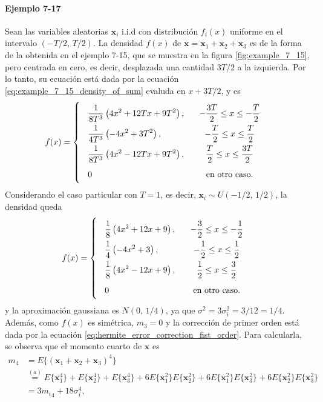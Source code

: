 \documentclass[a4paper]{report}
\newcommand{\x}{\mathbf{x}}
\begin{document}
\paragraph{Ejemplo 7-17} Sean las variables aleatorias \(\x_i\) i.i.d con distribución \(f_i(x)\) uniforme en el intervalo \((-T/2,\,T/2)\). La densidad \(f(x)\) de \(\x=\x_1+\x_2+\x_3\) es de la forma de la obtenida en el ejemplo 7-15, que se muestra en la figura \ref{fig:example_7_15}, pero centrada en cero, es decir, desplazada una cantidad \(3T/2\) a la izquierda. Por lo tanto, su ecuación está dada por la ecuación \ref{eq:example_7_15_density_of_sum} evaluda en \(x+3T/2\), y es
\[
 f(x)=
\def\arraystretch{2}\arraycolsep=9pt
 \left\{\begin{array}{lc}
   \displaystyle\frac{1}{8T^3}\left(4x^2+12Tx+9T^2\right), & -\dfrac{3T}{2}\leq x\leq-\dfrac{T}{2}\\
   \displaystyle\frac{1}{4T^3}\left(-4x^2+3T^2\right), & -\dfrac{T}{2}\leq x\leq\dfrac{T}{2}\\ 
   \displaystyle\frac{1}{8T^3}\left(4x^2-12Tx+9T^2\right), & \dfrac{T}{2}\leq x\leq\dfrac{3T}{2}\\ 
   0 & \textrm{en otro caso.}
 \end{array} \right.
\]
Considerando el caso particular con \(T=1\), es decir, \(\x_i\sim U(-1/2,\,1/2)\), la densidad queda
\[
 f(x)=
\def\arraystretch{2}\arraycolsep=9pt
 \left\{\begin{array}{lc}
   \displaystyle\frac{1}{8}\left(4x^2+12x+9\right), & -\dfrac{3}{2}\leq x\leq-\dfrac{1}{2}\\
   \displaystyle\frac{1}{4}\left(-4x^2+3\right), & -\dfrac{1}{2}\leq x\leq\dfrac{1}{2}\\ 
   \displaystyle\frac{1}{8}\left(4x^2-12x+9\right), & \dfrac{1}{2}\leq x\leq\dfrac{3}{2}\\ 
   0 & \textrm{en otro caso.}
 \end{array} \right.
\]
y la aproximación gaussiana es \(N(0,\,1/4)\), ya que \(\sigma^2=3\sigma^2_i=3/12=1/4\). Además, como \(f(x)\) es simétrica, \(m_3=0\) y la corrección de primer orden está dada por la ecuación \ref{eq:hermite_error_correction_fist_order}. Para calcularla, se observa que el momento cuarto de \(\x\) es
\begin{align*}
 m_4&=E\{(\x_1+\x_2+\x_3)^4\}\\
   &\overset{(a)}{=}E\{\x_1^4\}+E\{\x_2^4\}+E\{\x_3^4\}+6E\{\x_1^2\}E\{\x_2^2\}+6E\{\x_1^2\}E\{\x_3^2\}+6E\{\x_2^2\}E\{\x_3^2\}\\
   &=3{m_i}_4+18\sigma_i^4,
\end{align*}
\end{document}
